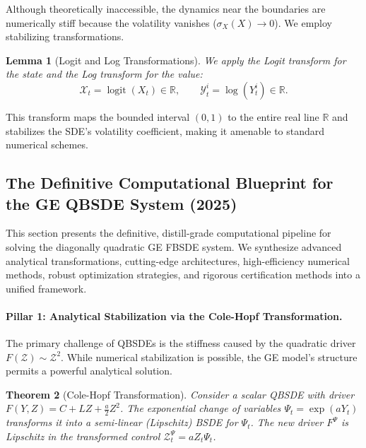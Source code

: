 \documentclass[11pt,letterpaper,oneside]{article}
\theoremstyle{plain}
\newtheorem{theorem}{Theorem}[section]
\newtheorem{lemma}[theorem]{Lemma}
\theoremstyle{definition}
\theoremstyle{remark}
\begin{document}
Although theoretically inaccessible, the dynamics near the boundaries are numerically stiff because the volatility vanishes ($\sigma_X(X) \to 0$). We employ stabilizing transformations.

\begin{lemma}[Logit and Log Transformations]
We apply the Logit transform for the state and the Log transform for the value:
\begin{equation}
    \mathcal{X}_t = \operatorname{logit}(X_t) \in \mathbb{R}, \qquad \mathcal{Y}^i_t = \log(Y^i_t) \in \mathbb{R}.
\end{equation}
\end{lemma}
This transform maps the bounded interval $(0,1)$ to the entire real line $\mathbb{R}$ and stabilizes the SDE's volatility coefficient, making it amenable to standard numerical schemes.

\subsection{The Definitive Computational Blueprint for the GE QBSDE System (2025)}
\label{subsec:GE_discretization_full_R3}

This section presents the definitive, distill-grade computational pipeline for solving the diagonally quadratic GE FBSDE system. We synthesize advanced analytical transformations, cutting-edge architectures, high-efficiency numerical methods, robust optimization strategies, and rigorous certification methods into a unified framework.

\paragraph{Pillar 1: Analytical Stabilization via the Cole-Hopf Transformation.}

The primary challenge of QBSDEs is the stiffness caused by the quadratic driver $F(\mathcal{Z}) \sim \mathcal{Z}^2$. While numerical stabilization is possible, the GE model's structure permits a powerful analytical solution.

\begin{theorem}[Cole-Hopf Transformation]
Consider a scalar QBSDE with driver $F(Y, Z) = C + LZ + \frac{a}{2} Z^2$. The exponential change of variables $\Psi_t = \exp(a Y_t)$ transforms it into a semi-linear (Lipschitz) BSDE for $\Psi_t$. The new driver $F^\Psi$ is Lipschitz in the transformed control $\mathcal{Z}^\Psi_t = a Z_t \Psi_t$.
\end{theorem}
\end{document}
